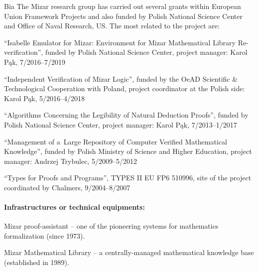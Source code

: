 \begin{sitedescription}{Bia}
The Mizar research group has carried out several grants within European Union Framework Projects 
and also funded by Polish National Science Center and Office of Naval Research, US.
The most related to the project are:

\begin{compactitem}
\item ``Isabelle Emulator for Mizar: Environment for Mizar Mathematical Library Re-verification'',
funded by Polish National Science Center, project manager: Karol Pąk, 7/2016--7/2019
\item ``Independent Verification of Mizar Logic'', funded by the OeAD Scientific \& Technological Cooperation with Poland,
project coordinator at the Polish side: Karol Pąk, 5/2016--4/2018
\item ``Algorithms Concerning the Legibility of Natural Deduction Proofs'', funded by Polish National Science Center,
project manager: Karol Pąk, 7/2013--1/2017
\item ``Management of a~Large Repository of Computer Verified Mathematical Knowledge'',
funded by Polish Ministry of Science and Higher Education, project manager: Andrzej Trybulec, 5/2009--5/2012
\item ``Types for Proofs and Programs'', TYPES II EU FP6 510996,
site of the project coordinated by Chalmers, 9/2004--8/2007
\end{compactitem}



\paragraph*{Infrastructures or technical equipments:}

\begin{compactitem} 
\item Mizar proof-assistant -- one of the pioneering systems for mathematics formalization (since 1973).
\item Mizar Mathematical Library -- a centrally-managed mathematical knowledge base (established in 1989).
\end{compactitem}


\end{sitedescription}
